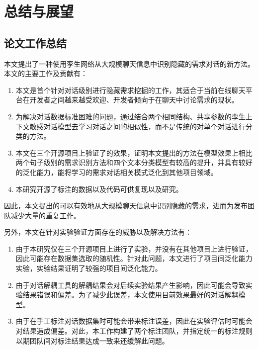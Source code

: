 \chapter{总结与展望}
\section{论文工作总结}
本文提出了一种使用孪生网络从大规模聊天信息中识别隐藏的需求对话的新方法{\tool}。本文的主要工作及贡献有：
\begin{enumerate}
    \item 本文是首个针对对话级别进行隐藏需求挖掘的工作，其适合于当前在线聊天平台在开发者之间越来越受欢迎、开发者倾向于在聊天中讨论需求的现状。
    \item 为解决对话数据标准困难的问题，{\tool}通过结合两个相同结构、共享参数的孪生上下文敏感对话模型{\dm}去学习对话之间的相似性，而不是传统的对单个对话进行分类的方法。
    \item 本文在三个开源项目上验证了{\tool}的效果，证明本文提出的方法在模型效果上相比两个句子级别的需求识别方法和四个文本分类模型有较高的提升，并具有较好的泛化能力，能将学习的需求对话相关模式泛化到其他项目领域。
    \item 本研究开源了标注的数据以及代码可供复现以及研究。
\end{enumerate}

因此，本文提出的{\tool}可以有效地从大规模聊天信息中识别隐藏的需求，进而为发布团队减少大量的重复工作。

另外，本文在针对实验验证方面存在的威胁以及解决方法有：
\begin{enumerate}
    \item 由于本研究仅在三个开源项目上进行了实验，并没有在其他项目上进行验证，因此可能存在数据集选取的随机性。针对此问题，本文进行了项目间泛化能力实验，实验结果证明了{\tool}较强的项目间泛化能力。
    \item 由于对话解耦工具的解耦结果会对后续实验结果产生影响，因此可能会导致实验结果错误和偏差。为了减少此误差，本文使用目前效果最好的对话解耦模型。
    \item 由于在手工标注对话数据集时可能会带来标注误差，因此在实验评估时可能会对结果造成偏差。对此，本工作构建了两个标注团队，并指定统一的标注规则以期团队间对标注结果达成一致来还缓解此问题。
\end{enumerate}






